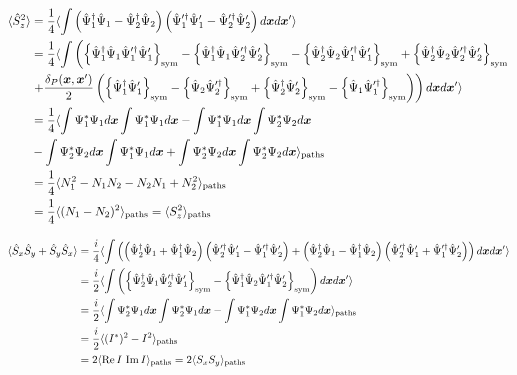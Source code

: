 \begin{equation*}
\begin{split}
	\langle \hat{S}^2_z \rangle
	& = \frac{1}{4} \langle \int \left(
		\hat{\Psi}^\dagger_1 \hat{\Psi}_1 - \hat{\Psi}^\dagger_2 \hat{\Psi}_2
	\right)
	\left(
		\hat{\Psi}^{\prime\dagger}_1 \hat{\Psi}^\prime_1 - \hat{\Psi}^{\prime\dagger}_2 \hat{\Psi}^\prime_2
	\right) d\boldsymbol{x} d\boldsymbol{x}^\prime \rangle \\
	& = \frac{1}{4} \langle \int \left(
		\left\{  \hat{\Psi}^\dagger_1 \hat{\Psi}_1 \hat{\Psi}^{\prime\dagger}_1 \hat{\Psi}^\prime_1  \right\}_{\mathrm{sym}}
		- \left\{  \hat{\Psi}^\dagger_1 \hat{\Psi}_1 \hat{\Psi}^{\prime\dagger}_2 \hat{\Psi}^\prime_2  \right\}_{\mathrm{sym}}
		- \left\{  \hat{\Psi}^\dagger_2 \hat{\Psi}_2 \hat{\Psi}^{\prime\dagger}_1 \hat{\Psi}^\prime_1  \right\}_{\mathrm{sym}}
		+ \left\{  \hat{\Psi}^\dagger_2 \hat{\Psi}_2 \hat{\Psi}^{\prime\dagger}_2 \hat{\Psi}^\prime_2  \right\}_{\mathrm{sym}}
	\right. \\
	& \left.
		+ \frac{\delta_P(\boldsymbol{x},\boldsymbol{x}^\prime)}{2} \left(
			\left\{  \hat{\Psi}^\dagger_1 \hat{\Psi}^\prime_1  \right\}_{\mathrm{sym}}
			- \left\{  \hat{\Psi}_2 \hat{\Psi}^{\prime\dagger}_2  \right\}_{\mathrm{sym}}
			+ \left\{  \hat{\Psi}^\dagger_2 \hat{\Psi}^\prime_2  \right\}_{\mathrm{sym}}
			- \left\{  \hat{\Psi}_1 \hat{\Psi}^{\prime\dagger}_1  \right\}_{\mathrm{sym}}
		\right)
	\right) d\boldsymbol{x} d\boldsymbol{x}^\prime \rangle \\
	& = \frac{1}{4} \langle 
		\int \Psi^*_1 \Psi_1 d\boldsymbol{x} \int \Psi^*_1 \Psi_1 d\boldsymbol{x}
		- \int \Psi^*_1 \Psi_1 d\boldsymbol{x} \int \Psi^*_2 \Psi_2 d\boldsymbol{x} \\
	&	- \int \Psi^*_2 \Psi_2 d\boldsymbol{x} \int \Psi^*_1 \Psi_1 d\boldsymbol{x}
		+ \int \Psi^*_2 \Psi_2 d\boldsymbol{x} \int \Psi^*_2 \Psi_2 d\boldsymbol{x}  \rangle_{\mathrm{paths}} \\
	& = \frac{1}{4} \langle  N^2_1 - N_1 N_2 - N_2 N_1 + N^2_2  \rangle_{\mathrm{paths}} \\
	& = \frac{1}{4} \langle  (N_1 - N_2)^2  \rangle_{\mathrm{paths}} = \langle  S^2_z  \rangle_{\mathrm{paths}}
\end{split}
\end{equation*}

\begin{equation*}
\begin{split}
	\langle \hat{S}_x \hat{S}_y + \hat{S}_y \hat{S}_x \rangle
	& = \frac{i}{4} \langle \int \left(
		\left(
			\hat{\Psi}^\dagger_2 \hat{\Psi}_1 + \hat{\Psi}^\dagger_1 \hat{\Psi}_2
		\right)
		\left(
			\hat{\Psi}^{\prime\dagger}_2 \hat{\Psi}^\prime_1 - \hat{\Psi}^{\prime\dagger}_1 \hat{\Psi}^\prime_2
		\right)
		+ \left(
			\hat{\Psi}^\dagger_2 \hat{\Psi}_1 - \hat{\Psi}^\dagger_1 \hat{\Psi}_2
		\right)
		\left(
			\hat{\Psi}^{\prime\dagger}_2 \hat{\Psi}^\prime_1 + \hat{\Psi}^{\prime\dagger}_1 \hat{\Psi}^\prime_2
		\right)
	\right) d\boldsymbol{x} d\boldsymbol{x}^\prime \rangle \\
	& = \frac{i}{2} \langle \int \left(
		\left\{  \hat{\Psi}^\dagger_2 \hat{\Psi}_1 \hat{\Psi}^{\prime\dagger}_2 \hat{\Psi}^\prime_1  \right\}_{\mathrm{sym}}
		- \left\{  \hat{\Psi}^\dagger_1 \hat{\Psi}_2 \hat{\Psi}^{\prime\dagger}_1 \hat{\Psi}^\prime_2  \right\}_{\mathrm{sym}}
	\right) d\boldsymbol{x} d\boldsymbol{x}^\prime \rangle \\
	& = \frac{i}{2} \langle 
		\int \Psi^*_2 \Psi_1 d\boldsymbol{x} \int \Psi^*_2 \Psi_1 d\boldsymbol{x}
		- \int \Psi^*_1 \Psi_2 d\boldsymbol{x} \int \Psi^*_1 \Psi_2 d\boldsymbol{x}  \rangle_{\mathrm{paths}} \\
	& = \frac{i}{2} \langle  (I^*)^2 - I^2  \rangle_{\mathrm{paths}} \\
	& = 2 \langle  \operatorname{Re} I \, \operatorname{Im} I  \rangle_{\mathrm{paths}} = 2 \langle  S_x S_y  \rangle_{\mathrm{paths}}
\end{split}
\end{equation*}


